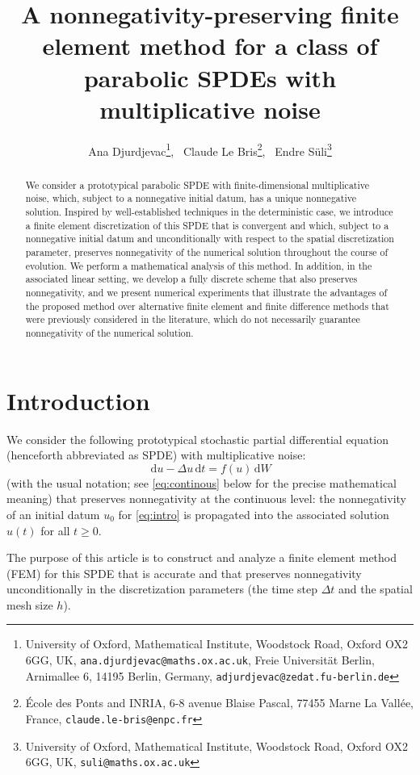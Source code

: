 \documentclass[12pt]{article}
\title{A nonnegativity-preserving finite element method for a class of parabolic SPDEs with multiplicative noise}
\author{Ana Djurdjevac\thanks{University of Oxford, Mathematical Institute, Woodstock Road, Oxford OX2 6GG, UK, {\tt ana.djurdjevac@maths.ox.ac.uk}, Freie Universität Berlin, Arnimallee 6, 14195 Berlin, Germany, {\tt adjurdjevac@zedat.fu-berlin.de}},~ Claude Le Bris\thanks{{\'E}cole des Ponts and INRIA, 6-8 avenue Blaise Pascal, 77455 Marne La Vall{\'e}e, France, {\tt claude.le-bris@enpc.fr}},~ Endre S\"uli\thanks{University of Oxford, Mathematical Institute, Woodstock Road, Oxford OX2 6GG, UK, {\tt suli@maths.ox.ac.uk}}}
\date{}
\newcommand{\dd}{\,\mathrm{d}}
\begin{document}
\maketitle

\begin{abstract}
 We consider a prototypical parabolic SPDE with finite-dimensional multiplicative noise, which, subject to a nonnegative initial datum, has a unique nonnegative solution. Inspired by well-established techniques in the deterministic case, we introduce a finite element discretization of this SPDE that is convergent and which, subject to a nonnegative initial datum and unconditionally with respect to the spatial discretization parameter, preserves nonnegativity of the numerical solution throughout the course of evolution. We perform a mathematical analysis of this method. In addition, in the associated linear setting, we develop a fully discrete scheme that also preserves nonnegativity, and we present numerical experiments that illustrate the advantages of the proposed method over alternative finite element and finite difference methods that were previously considered in the literature, which do not necessarily guarantee nonnegativity of the numerical solution.
\end{abstract}


\section{Introduction}\label{sec1}


We consider the following prototypical stochastic partial differential equation (henceforth abbreviated as SPDE) with multiplicative noise:
  \begin{equation}\label{eq:intro}
  \dd u - \Delta u \dd t = f(u) \dd W
  \end{equation}
(with the usual notation; see \eqref{eq:continous} below for the precise mathematical meaning) that preserves nonnegativity at the continuous level: the nonnegativity of an initial datum $u_0$ for \eqref{eq:intro} is propagated into the associated solution $u(t)$ for all $t\geq 0$.

The purpose of this article is to construct and analyze a finite element method (FEM) for this SPDE that is accurate and that preserves nonnegativity unconditionally in the discretization parameters (the time step $\Delta t$ and the spatial mesh size $h$).
\end{document}
